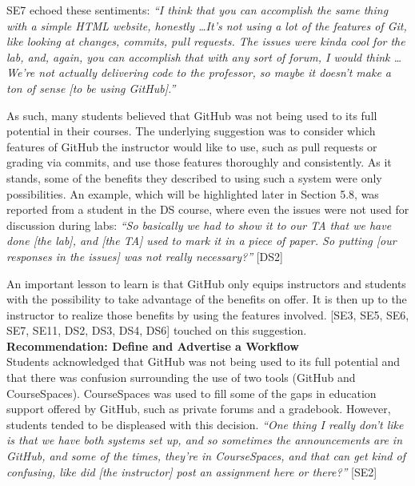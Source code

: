 SE7 echoed these sentiments: \textit{``I think that you can accomplish the same thing with a simple HTML website, honestly \ldots It's not using a lot of the features of Git, like looking at changes, commits, pull requests. The issues were kinda cool for the lab, and, again, you can accomplish that with any sort of forum, I would think \ldots We're not actually delivering code to the professor, so maybe it doesn't make a ton of sense [to be using GitHub].''}

As such, many students believed that GitHub was not being used to its full potential in their courses. The underlying suggestion was to consider which features of GitHub the instructor would like to use, such as pull requests or grading via commits, and use those features thoroughly and consistently. As it stands, some of the benefits they described to using such a system were only possibilities. An example, which will be highlighted later in Section 5.8, was reported from a student in the DS course, where even the issues were not used for discussion during labs: \textit{``So basically we had to show it to our TA that we have done [the lab], and [the TA] used to mark it in a piece of paper. So putting [our responses in the issues] was not really necessary?''} [DS2]

An important lesson to learn is that GitHub only equips instructors and students with the possibility to take advantage of the benefits on offer. It is then up to the instructor to realize those benefits by using the features involved. [SE3, SE5, SE6, SE7, SE11, DS2, DS3, DS4, DS6] touched on this suggestion. \\

\textbf{Recommendation: Define and Advertise a Workflow} \\
Students acknowledged that GitHub was not being used to its full potential and that there was confusion surrounding the use of two tools (GitHub and CourseSpaces). CourseSpaces was used to fill some of the gaps in education support offered by GitHub, such as private forums and a gradebook. However, students tended to be displeased with this decision. \textit{``One thing I really don't like is that we have both systems set up, and so sometimes the announcements are in GitHub, and some of the times, they're in CourseSpaces, and that can get kind of confusing, like did [the instructor] post an assignment here or there?''} [SE2]

